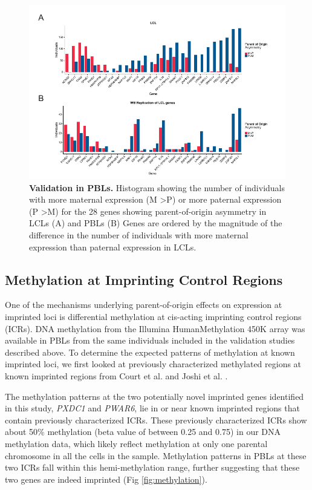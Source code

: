 \begin{figure}[!htb]
\centering \includegraphics[width=6in]{img/ch03/fig-02.pdf}
\caption[Validation in PBLs.]{\textbf{Validation in PBLs.} Histogram showing the number of individuals with more maternal expression (M \textgreater P) or more paternal expression (P \textgreater M) for the 28 genes showing parent-of-origin asymmetry in LCLs (A) and PBLs (B) Genes are ordered by the magnitude of the difference in the number of individuals with more maternal expression than paternal expression in LCLs. }
\label{fig:matpatPBLs}
\end{figure}


\subsection{Methylation at Imprinting Control Regions}\label{Methylation at Imprinting Control Regions}
One of the mechanisms underlying parent-of-origin effects on expression at imprinted loci is differential methylation at cis-acting imprinting control regions (ICRs). DNA methylation from the Illumina HumanMethylation 450K array was available in PBLs from the same individuals included in the validation studies described above. To determine the expected patterns of methylation at known imprinted loci, we first looked at previously characterized methylated regions at known imprinted regions from Court et al. and Joshi et al. \cite{Court:2014kc,Joshi:2016bb}.

The methylation patterns at the two potentially novel imprinted genes identified in this study, \emph{PXDC1} and \emph{PWAR6}, lie in or near known imprinted regions that contain previously characterized ICRs. These previously characterized ICRs show about 50\% methylation (beta value of between 0.25 and 0.75) in our DNA methylation data, which likely reflect methylation at only one parental chromosome in all the cells in the sample. Methylation patterns in PBLs at these two ICRs fall within this hemi-methylation range, further suggesting that these two genes are indeed imprinted (Fig \ref{fig:methylation}).


